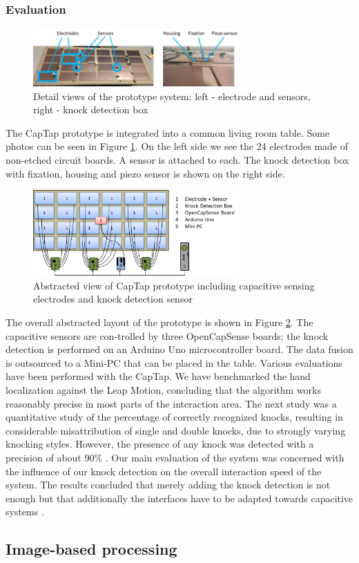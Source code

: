 \subsubsection{Evaluation}
\begin{figure}[h]
\centering
\includegraphics[width=0.7\textwidth]{images/captap_proto}
\caption{Detail views of the prototype system: left - electrode and sensors, right - knock detection box \cite{Braun2013ChairAid}}
\label{fig:captap_proto}
\end{figure}
The CapTap prototype is integrated into a common living room table. Some photos can be seen in Figure \ref{fig:captap_proto}. On the left side we see the 24 electrodes made of non-etched circuit boards. A sensor is attached to each. The knock detection box with fixation, housing and piezo sensor is shown on the right side.
\begin{figure}[h]
\centering
\includegraphics[width=0.7\textwidth]{images/captap_system}
\caption{Abstracted view of CapTap prototype including capacitive sensing electrodes and knock detection sensor \cite{Braun2013ChairAid}}
\label{fig:captap_system}
\end{figure} 
The overall abstracted layout of the prototype is shown in Figure \ref{fig:captap_system}. The capacitive sensors are con-trolled by three OpenCapSense boards; the knock detection is performed on an Arduino Uno microcontroller board. The data fusion is outsourced to a Mini-PC that can be placed in the table.
Various evaluations have been performed with the CapTap. We have benchmarked the hand localization against the Leap Motion, concluding that the algorithm works reasonably precise in most parts of the interaction area. The next study was a quantitative study of the percentage of correctly recognized knocks, resulting in considerable misattribution of single and double knocks, due to strongly varying knocking styles. However, the presence of any knock was detected with a precision of about $90\%$ \cite{Braun2013ChairAid}. Our main evaluation of the system was concerned with the influence of our knock detection on the overall interaction speed of the system. The results concluded that merely adding the knock detection is not enough but that additionally the interfaces have to be adapted towards capacitive systems \cite{Braun2013ChairAid}.

\subsection{Image-based processing}

